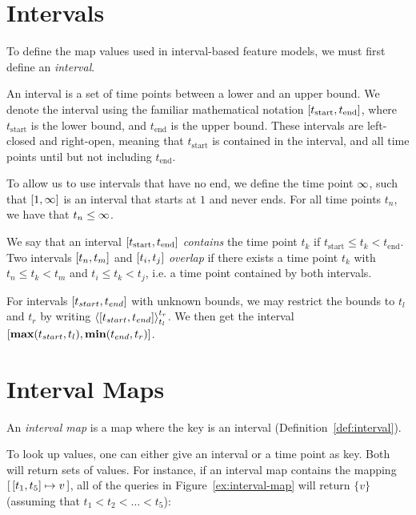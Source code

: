 \section{Intervals}
\label{sec:intervals}
To define the map values used in interval-based feature models, we must first define an \emph{interval}.
\begin{definition}[Interval]
  An interval is a set of time points between a lower and an upper bound. We denote the interval using the familiar mathematical notation $\interval{t_\text{start}}{t_\text{end}}$, where $t_\text{start}$ is the lower bound, and $t_\text{end}$ is the upper bound. These intervals are left-closed and right-open, meaning that $t_\text{start}$ is contained in the interval, and all time points until but not including $t_\text{end}$.
  \label{def:interval}
\end{definition}

To allow us to use intervals that have no end, we define the time point $\infty$, such that $\interval{1}{\forever}$ is an interval that starts at $1$ and never ends. For all time points $t_n$, we have that $t_n \leq \infty$. 

We say that an interval $\interval{t_\text{start}}{t_\text{end}}$ \emph{contains} the time point $t_k$ if $t_\text{start} \leq t_k < t_\text{end}$. Two intervals $\interval{t_n}{t_m}$ and $\interval{t_i}{t_j}$ \emph{overlap} if there exists a time point $t_k$ with $t_n \leq t_k < t_m$ and $t_i \leq t_k < t_j$, i.e. a time point contained by both intervals.

For intervals $\interval{t_{start}}{t_{end}}$ with unknown bounds, we may restrict the bounds to $t_l$ and $t_r$ by writing $\clamp{\interval{t_{start}}{t_{end}}}{t_l}{t_r}$. We then get the interval $\interval{\textbf{max}(t_{start}, t_l)}{\textbf{min}(t_{end}, t_r)}$.

\section{Interval Maps}
\label{sec:interval-maps}
\begin{definition}
An \emph{interval map} is a map where the key is an interval (Definition~\vref{def:interval}). 
  \label{def:interval-map}
\end{definition}

To look up values, one can either give an interval or a time point as key. Both will return sets of values. For instance, if an interval map  contains the mapping $\intervalmapping{t_1}{t_5}{v}$, all of the queries in Figure~\vref{ex:interval-map} will return $\{v\}$ (assuming that $t_1 < t_2 < \ldots < t_5$):

